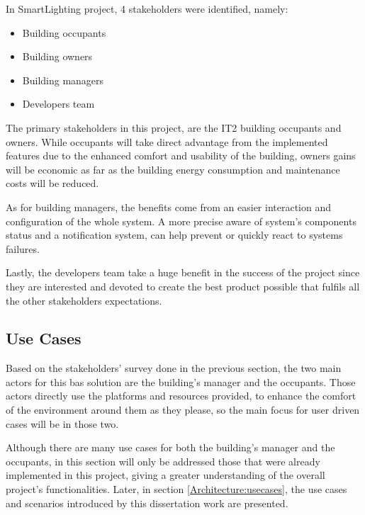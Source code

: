 In SmartLighting project, 4 stakeholders were identified, namely:

\begin{itemize}
	\item Building occupants
	\item Building owners
	\item Building managers
	\item Developers team
\end{itemize}


The primary stakeholders in this project, are the IT2 building occupants and owners. While occupants will take direct advantage from the implemented features due to the enhanced comfort and usability of the building, owners gains will be economic as far as the building energy consumption and maintenance costs will be reduced.

As for building managers, the benefits come from an easier interaction and configuration of the whole system. A more precise aware of system's components status and a notification system, can help prevent or quickly react to systems failures.

Lastly, the developers team take a huge benefit in the success of the project since they are interested and devoted to create the best product possible that fulfils all the other stakeholders expectations.


\subsection{Use Cases}
\label{Architecture:SLusecases}

Based on the stakeholders' survey done in the previous section, the two main actors for this \ac{bas} solution are the building's manager and the occupants. Those actors directly use the platforms and resources provided, to enhance the comfort of the environment around them as they please, so the main focus for user driven cases will be in those two. 

Although there are many use cases for both the building’s manager and the occupants, in this section will only be addressed those that were already implemented in this project, giving a greater understanding of the overall project’s functionalities. Later, in section \ref{Architecture:usecases}, the use cases and scenarios introduced by this dissertation work are presented.

